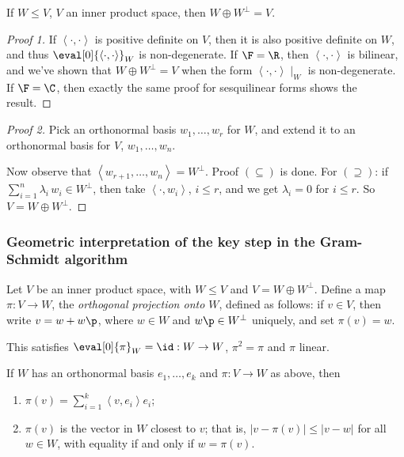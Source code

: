 \begin{proposition}
	If $W\leq V$, $V$ an inner product space, then $W\oplus W^\perp = V$. %
\end{proposition}

\begin{proof}
	[Proof 1] If $\left\langle \cdot,\cdot \right\rangle$ is positive definite on $V$, then it is also positive definite on $W$, and thus $\eval[0]{\left\langle \cdot,\cdot \right\rangle}_{W}$ is non-degenerate. If $\F=\R$, then $\left\langle \cdot,\cdot \right\rangle$ is bilinear, and we've shown that $W\oplus W^\perp=V$ when the form $\left\langle \cdot,\cdot \right\rangle\mid_{W}$ is non-degenerate. If $\F=\C$, then exactly the same proof for sesquilinear forms shows the result. %
\end{proof}

\begin{proof}
	[Proof 2] Pick an orthonormal basis $w_1,\ldots,w_r$ for $W$, and extend it to an orthonormal basis for $V$, $w_1,\ldots,w_n$. %
	
	Now observe that $\left\langle w_{r+1},\ldots,w_n \right\rangle=W^\perp$. Proof $(\subseteq)$ is done. For $(\supseteq)$: if $\sum_{i=1}^n \lambda_i\,w_i \in W^\perp$, then take $\left\langle \cdot,w_i \right\rangle$, $i\leq r$, and we get $\lambda_i=0$ for $i\leq r$. So $V=W\oplus W^\perp$. %
\end{proof}

\subsubsection*{Geometric interpretation of the key step in the Gram-Schmidt algorithm} %
\label{ssub:geometric}

Let $V$ be an inner product space, with $W\leq V$ and $V=W\oplus W^\perp$. Define a map $\pi:V\to W$, the \emph{orthogonal projection onto $W$}, defined as follows: if $v\in V$, then write $v=w+w\p$, where $w\in W$ and $w\p\in W^\perp$ uniquely, and set $\pi(v)=w$.

This satisfies $\eval[0]{\pi}_{W}=\id :W\to W$, $\pi^2=\pi$ and $\pi$ linear.

\begin{proposition}
	If $W$ has an orthonormal basis $e_1,\ldots,e_k$ and $\pi:V\to W$ as above, then %
	\begin{enumerate}
		\shortskip
		\item $\pi(v) = \sum_{i=1}^k \left\langle v,e_i \right\rangle e_i$;
		\item $\pi(v)$ is the vector in $W$ closest to $v$; that is, $\left\vert v-\pi(v) \right\vert\leq \left\vert v-w \right\vert$ for all $w\in W$, with equality if and only if $w=\pi(v)$. %
	\end{enumerate}
\end{proposition}


